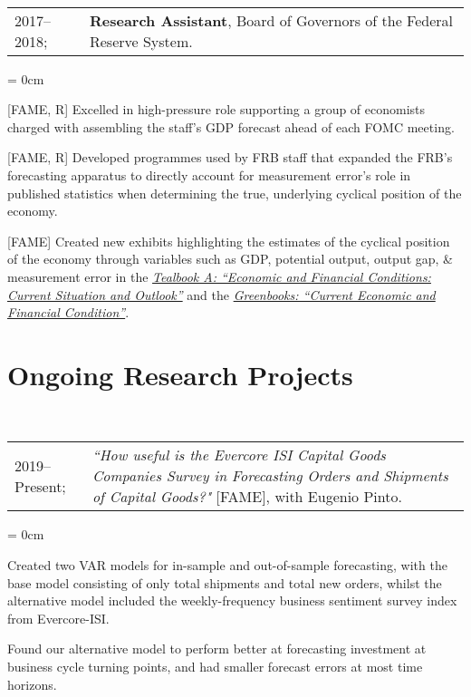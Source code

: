 \documentclass[a4paper, 11pt]{article}
\begin{document}
  ~\begin{tabular}{ll}
    2017--2018; & \textbf{Research Assistant}, Board of Governors of the Federal Reserve System.
  \end{tabular}
  \begin{compactitem}\parskip = 0cm
    \item {[FAME, R]} Excelled in high-pressure role supporting a group of economists charged with assembling the staff's GDP forecast ahead of each FOMC meeting.
    \item {[FAME, R]} Developed programmes used by FRB staff that expanded the FRB's forecasting apparatus to directly account for measurement error's role in published statistics when determining the true, underlying cyclical position of the economy.
    \item {[FAME]} Created new exhibits highlighting the estimates of the cyclical position of the economy through variables such as GDP, potential output, output gap, \& measurement error in the \href{https://www.federalreserve.gov/monetarypolicy/fomc_historical.htm#tealbooks}{\textit{Tealbook A: ``Economic and Financial Conditions: Current Situation and Outlook''}} and the \href{https://www.federalreserve.gov/monetarypolicy/fomc_historical.htm#greenbooks}{\textit{Greenbooks: ``Current Economic and Financial Condition''}}.
  \end{compactitem}
      
  \section{Ongoing Research Projects}
  ~\begin{tabular}{lP{15cm}}
    2019--Present; & \textit{``How useful is the Evercore ISI Capital Goods Companies Survey in Forecasting Orders and Shipments of Capital Goods?"} {[FAME]}, with Eugenio Pinto.
  \end{tabular}
  \begin{compactitem}\parskip = 0cm
    \item Created two VAR models for in-sample and out-of-sample forecasting, with the base model consisting of only total shipments and total new orders, whilst the alternative model included the weekly-frequency business sentiment survey index from Evercore-ISI.
    \item Found our alternative model to perform better at forecasting investment at business cycle turning points, and had smaller forecast errors at most time horizons.
  \end{compactitem}
  \vspace*{1em}
      
\end{document}
